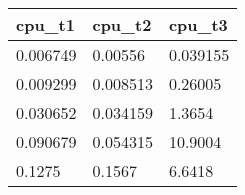 \begin{tabular}{lll}
cpu_t1 & cpu_t2 & cpu_t3 \\ 
\hline 
0.006749 & 0.00556 & 0.039155 \\ 
0.009299 & 0.008513 & 0.26005 \\ 
0.030652 & 0.034159 & 1.3654 \\ 
0.090679 & 0.054315 & 10.9004 \\ 
0.1275 & 0.1567 & 6.6418 \\ 
\hline 
\end{tabular}